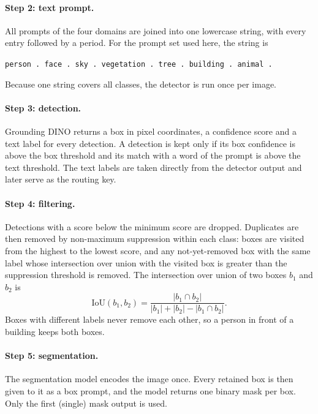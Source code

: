 \documentclass{FastFyp}
\begin{document}
\paragraph{Step 2: text prompt.} All prompts of the four domains are joined into one lowercase string, with every entry followed by a period. For the prompt set used here, the string is
\begin{center}
\texttt{person . face . sky . vegetation . tree . building . animal .}
\end{center}
Because one string covers all classes, the detector is run once per image.
 
\paragraph{Step 3: detection.} Grounding DINO returns a box in pixel coordinates, a confidence score and a text label for every detection. A detection is kept only if its box confidence is above the box threshold and its match with a word of the prompt is above the text threshold. The text labels are taken directly from the detector output and later serve as the routing key.
 
\paragraph{Step 4: filtering.} Detections with a score below the minimum score are dropped. Duplicates are then removed by non-maximum suppression within each class: boxes are visited from the highest to the lowest score, and any not-yet-removed box with the same label whose intersection over union with the visited box is greater than the suppression threshold is removed. The intersection over union of two boxes $b_1$ and $b_2$ is
\begin{equation}
\mathrm{IoU}(b_1,b_2)=\frac{|b_1\cap b_2|}{|b_1|+|b_2|-|b_1\cap b_2|}.
\end{equation}
Boxes with different labels never remove each other, so a person in front of a building keeps both boxes.
 
\paragraph{Step 5: segmentation.} The segmentation model encodes the image once. Every retained box is then given to it as a box prompt, and the model returns one binary mask per box. Only the first (single) mask output is used.
 
\end{document}
